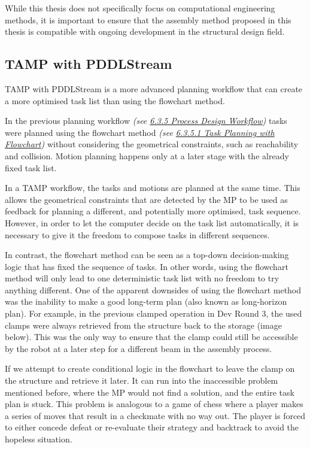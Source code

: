 While this thesis does not specifically focus on computational engineering methods, it is important to ensure that the assembly method proposed in this thesis is compatible with ongoing development in the structural design field.

\subsection{TAMP with PDDLStream}

TAMP with PDDLStream \parencite{garrettPDDLStreamIntegratingSymbolic2020}is a more advanced planning workflow that can create a more optimised task list than using the flowchart method.

In the previous planning workflow \textit{(see \ul{6.3.5 Process Design Workflow})} tasks were planned using the flowchart method \textit{(see \ul{6.3.5.1 Task Planning with Flowchart})} without considering the geometrical constraints, such as reachability and collision. Motion planning happens only at a later stage with the already fixed task list. 

In a TAMP workflow, the tasks and motions are planned at the same time. This allows the geometrical constraints that are detected by the MP to be used as feedback for planning a different, and potentially more optimised, task sequence. However, in order to let the computer decide on the task list automatically, it is necessary to give it the freedom to compose tasks in different sequences. 

In contrast, the flowchart method can be seen as a top-down decision-making logic that has fixed the sequence of tasks. In other words, using the flowchart method will only lead to one deterministic task list with no freedom to try anything different. One of the apparent downsides of using the flowchart method was the inability to make a good long-term plan (also known as long-horizon plan). For example, in the previous clamped operation in Dev Round 3, the used clamps were always retrieved from the structure back to the storage (image below). This was the only way to ensure that the clamp could still be accessible by the robot at a later step for a different beam in the assembly process. 




If we attempt to create conditional logic in the flowchart to leave the clamp on the structure and retrieve it later. It can run into the inaccessible problem mentioned before, where the MP would not find a solution, and the entire task plan is stuck. This problem is analogous to a game of chess where a player makes a series of moves that result in a checkmate with no way out. The player is forced to either concede defeat or re-evaluate their strategy and backtrack to avoid the hopeless situation.

